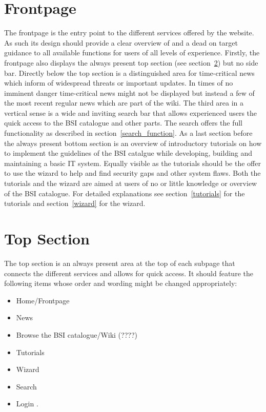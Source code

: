 \section{Frontpage}
The frontpage is the entry point to the different services offered by the website. 
As such its design should provide a clear overview of and a dead on target guidance to all available functions for users of all levels of experience.
Firstly, the frontpage also displays the always present top section (see section~\ref{top_section}) but no side bar.
Directly below the top section is a distinguished area for time-critical news which inform of widespread threats or important updates.
In times of no imminent danger time-critical news might not be displayed but instead a few of the most recent regular news which are part of the wiki.
The third area in a vertical sense is a wide and inviting search bar that allows experienced users the quick access to the BSI catalogue and other parts. 
The search offers the full functionality as described in section~\ref{search_function}.
As a last section before the always present bottom section is an overview of introductory tutorials on how to implement the guidelines of the BSI catalgue while developing, building and maintaining a basic IT system.
Equally visible as the tutorials should be the offer to use the wizard to help and find security gaps and other system flaws.
Both the tutorials and the wizard are aimed at users of no or little knowledge or overview of the BSI catalogue.
For detailed explanations see section~\ref{tutorials} for the tutorials and section~\ref{wizard} for the wizard.
 
\section{Top Section}
\label{top_section}

The top section is an always present area at the top of each subpage that connects the different services and allows for quick access.
It should feature the following items whose order and wording might be changed appropriately:
\begin{itemize}
    \item Home/Frontpage
    \item News
    \item Browse the BSI catalogue/Wiki (????)
    \item Tutorials
    \item Wizard
    \item Search
    \item Login 
        .
\end{itemize}
